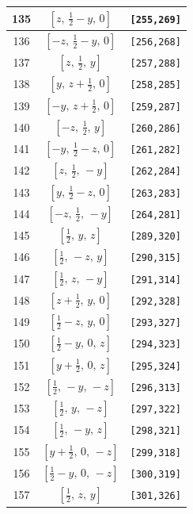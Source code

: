 \documentclass[fleqn,8pt]{jsarticle}
\begin{document}
\begin{longtable}{ccc}
135 & $\left[ z,\, \frac{1}{2} - y,\, 0 \right]$ & {\tt [255,269]} \\ \hline
136 & $\left[ - z,\, \frac{1}{2} - y,\, 0 \right]$ & {\tt [256,268]} \\ \hline
137 & $\left[ z,\, \frac{1}{2},\, y \right]$ & {\tt [257,288]} \\ \hline
138 & $\left[ y,\, z + \frac{1}{2},\, 0 \right]$ & {\tt [258,285]} \\ \hline
139 & $\left[ - y,\, z + \frac{1}{2},\, 0 \right]$ & {\tt [259,287]} \\ \hline
140 & $\left[ - z,\, \frac{1}{2},\, y \right]$ & {\tt [260,286]} \\ \hline
141 & $\left[ - y,\, \frac{1}{2} - z,\, 0 \right]$ & {\tt [261,282]} \\ \hline
142 & $\left[ z,\, \frac{1}{2},\, - y \right]$ & {\tt [262,284]} \\ \hline
143 & $\left[ y,\, \frac{1}{2} - z,\, 0 \right]$ & {\tt [263,283]} \\ \hline
144 & $\left[ - z,\, \frac{1}{2},\, - y \right]$ & {\tt [264,281]} \\ \hline
145 & $\left[ \frac{1}{2},\, y,\, z \right]$ & {\tt [289,320]} \\ \hline
146 & $\left[ \frac{1}{2},\, - z,\, y \right]$ & {\tt [290,315]} \\ \hline
147 & $\left[ \frac{1}{2},\, z,\, - y \right]$ & {\tt [291,314]} \\ \hline
148 & $\left[ z + \frac{1}{2},\, y,\, 0 \right]$ & {\tt [292,328]} \\ \hline
149 & $\left[ \frac{1}{2} - z,\, y,\, 0 \right]$ & {\tt [293,327]} \\ \hline
150 & $\left[ \frac{1}{2} - y,\, 0,\, z \right]$ & {\tt [294,323]} \\ \hline
151 & $\left[ y + \frac{1}{2},\, 0,\, z \right]$ & {\tt [295,324]} \\ \hline
152 & $\left[ \frac{1}{2},\, - y,\, - z \right]$ & {\tt [296,313]} \\ \hline
153 & $\left[ \frac{1}{2},\, y,\, - z \right]$ & {\tt [297,322]} \\ \hline
154 & $\left[ \frac{1}{2},\, - y,\, z \right]$ & {\tt [298,321]} \\ \hline
155 & $\left[ y + \frac{1}{2},\, 0,\, - z \right]$ & {\tt [299,318]} \\ \hline
156 & $\left[ \frac{1}{2} - y,\, 0,\, - z \right]$ & {\tt [300,319]} \\ \hline
157 & $\left[ \frac{1}{2},\, z,\, y \right]$ & {\tt [301,326]} \\ \hline

\end{longtable}
\end{document}
